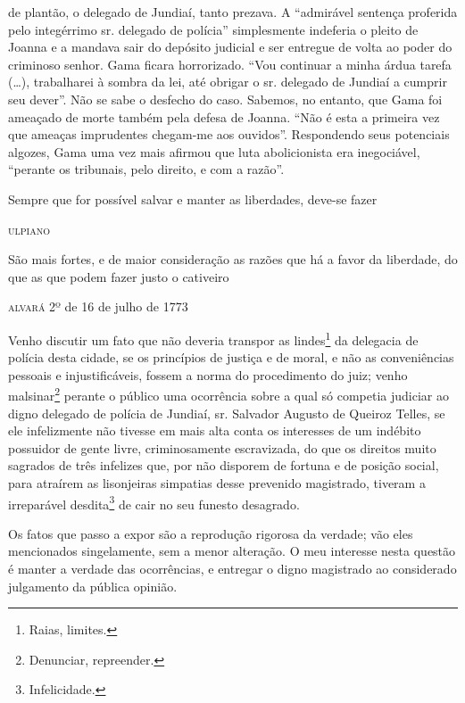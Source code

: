 \begin{didascalia}
{de plantão, o delegado de Jundiaí, tanto prezava. A ``admirável sentença
proferida pelo integérrimo sr. delegado de polícia'' simplesmente
indeferia o pleito de Joanna e a mandava sair do depósito judicial e ser
entregue de volta ao poder do criminoso senhor. Gama ficara horrorizado.
``Vou continuar a minha árdua tarefa (\ldots{}), trabalharei à sombra da lei,
até obrigar o sr. delegado de Jundiaí a cumprir seu dever''. Não se sabe
o desfecho do caso. Sabemos, no entanto, que Gama foi ameaçado de morte
também pela defesa de Joanna. ``Não é esta a primeira vez que ameaças
imprudentes chegam-me aos ouvidos''. Respondendo seus potenciais algozes,
Gama uma vez mais afirmou que luta abolicionista era inegociável,
``perante os tribunais, pelo direito, e com a razão''.}
\end{didascalia}

\epigraph{Sempre que for possível salvar e manter as liberdades, deve-se
fazer}{\textsc{ulpiano}\footnotemark}


\epigraph{São mais fortes, e de maior consideração as razões que há a favor
da liberdade, do que as que podem fazer justo o cativeiro}{\textsc{alvará 2º}
de 16 de julho de 1773}

Venho discutir um fato que não deveria transpor as lindes\footnote{
  Raias, limites.} da delegacia de polícia desta cidade, se os
princípios de justiça e de moral, e não as conveniências pessoais e
injustificáveis, fossem a norma do procedimento do juiz; venho
malsinar\footnote{ Denunciar, repreender.} perante o público uma
ocorrência sobre a qual só competia judiciar ao digno delegado de
polícia de Jundiaí, sr. Salvador Augusto de Queiroz Telles, se ele
infelizmente não tivesse em mais alta conta os interesses de um indébito
possuidor de gente livre, criminosamente escravizada, do que os direitos
muito sagrados de três infelizes que, por não disporem de fortuna e de
posição social, para atraírem as lisonjeiras simpatias desse prevenido
magistrado, tiveram a irreparável desdita\footnote{ Infelicidade.} de
cair no seu funesto desagrado.

Os fatos que passo a expor são a reprodução rigorosa da verdade; vão
eles mencionados singelamente, sem a menor alteração. O meu interesse
nesta questão é manter a verdade das ocorrências, e entregar o digno
magistrado ao considerado julgamento da pública opinião.

